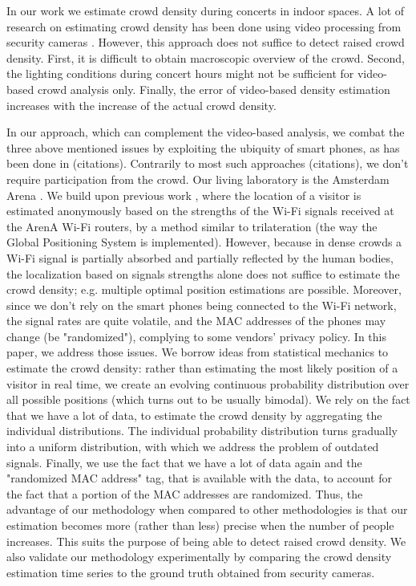 \documentclass[10pt,a4paper]{article}
\begin{document}
In our work we estimate crowd density during concerts in indoor spaces. A lot of research on estimating crowd density has been done using video processing from security cameras \cite{Crowded_Scene_Analysis, Krausz2012307}. However, this approach does not suffice to detect raised crowd density. First, it is difficult to obtain macroscopic overview of the crowd. Second, 
the lighting conditions during concert hours might not be sufficient for video-based crowd analysis only. Finally, the error of video-based density estimation increases with the increase of the actual crowd density.  

In our approach, which can complement the video-based analysis, we combat the three above mentioned issues by exploiting the ubiquity of smart phones, as has been done in (citations). Contrarily to most such approaches (citations), we  don't require participation from the crowd. Our living laboratory is the Amsterdam Arena \cite{arena}.  We build upon previous work \cite{customers_jan}, where the location of a visitor is estimated anonymously based on the strengths of the Wi-Fi signals received at the ArenA Wi-Fi routers,  by a method similar to trilateration (the way the Global Positioning System is implemented). However, because in dense crowds a Wi-Fi signal is partially absorbed and partially reflected by the human bodies, the localization based on signals strengths alone does not suffice to estimate the crowd density; e.g. multiple optimal position estimations are possible.  Moreover, since we don't rely on the smart phones being connected to the Wi-Fi network, the signal rates are quite volatile, and the MAC addresses of the phones may change (be "randomized"), complying to some  vendors' privacy policy. In this paper, we address those issues. We borrow ideas from statistical mechanics to estimate the crowd density: rather than estimating the most likely position of a visitor in real time, we create an evolving continuous probability distribution over all possible positions (which turns out to be usually bimodal). We rely on the fact that we have a lot of data, to estimate the crowd density by aggregating the individual distributions. The individual probability distribution turns gradually into a uniform distribution, with which we address the problem of outdated signals. Finally, we use the fact that we have a lot of data again and the "randomized MAC address" tag, that is available with the data, to account for the fact that a portion of the MAC addresses are randomized. Thus, the advantage of our methodology when compared to other methodologies is that our estimation becomes more (rather than less) precise when the number of people increases. This suits the purpose of being able to detect raised crowd density. 
We also validate our methodology experimentally by comparing the crowd density estimation time series to the ground truth obtained from security cameras. 
\end{document}
